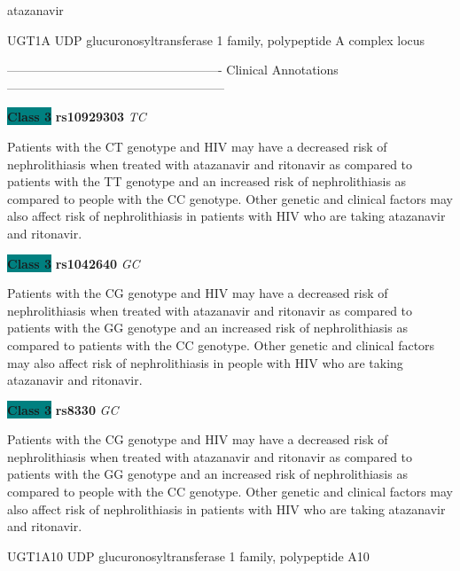 \documentclass{resume} %
\begin{document}
\begin{rSection}{ atazanavir }
\begin{rSubsection}{ UGT1A }{ UDP glucuronosyltransferase 1 family, polypeptide A complex locus }{}{}
\item[]

\item[] ---------------------------------------------------- Clinical Annotations -----------------------------------------------------\newline
\item \textbf{\colorbox{teal} {Class 3}} \textbf{ rs10929303 } \textit{ TC }
\item[] Patients with the CT genotype and HIV may have a decreased risk of nephrolithiasis when treated with atazanavir and ritonavir as compared to patients with the TT genotype and an increased risk of nephrolithiasis as compared to people with the CC genotype. Other genetic and clinical factors may also affect risk of nephrolithiasis in patients with HIV who are taking atazanavir and ritonavir. \item \textbf{\colorbox{teal} {Class 3}} \textbf{ rs1042640 } \textit{ GC }
\item[] Patients with the CG genotype and HIV may have a decreased risk of nephrolithiasis when treated with atazanavir and ritonavir as compared to patients with the GG genotype and an increased risk of nephrolithiasis as compared to patients with the CC genotype. Other genetic and clinical factors may also affect risk of nephrolithiasis in people with HIV who are taking atazanavir and ritonavir.\item \textbf{\colorbox{teal} {Class 3}} \textbf{ rs8330 } \textit{ GC }
\item[] Patients with the CG genotype and HIV may have a decreased risk of nephrolithiasis when treated with atazanavir and ritonavir as compared to patients with the GG genotype and an increased risk of nephrolithiasis as compared to people with the CC genotype. Other genetic and clinical factors may also affect risk of nephrolithiasis in patients with HIV who are taking atazanavir and ritonavir.
\end{rSubsection}\begin{rSubsection}{ UGT1A10 }{ UDP glucuronosyltransferase 1 family, polypeptide A10 }{}{}
\item[]


\end{rSubsection}
\end{rSection}
\end{document}

